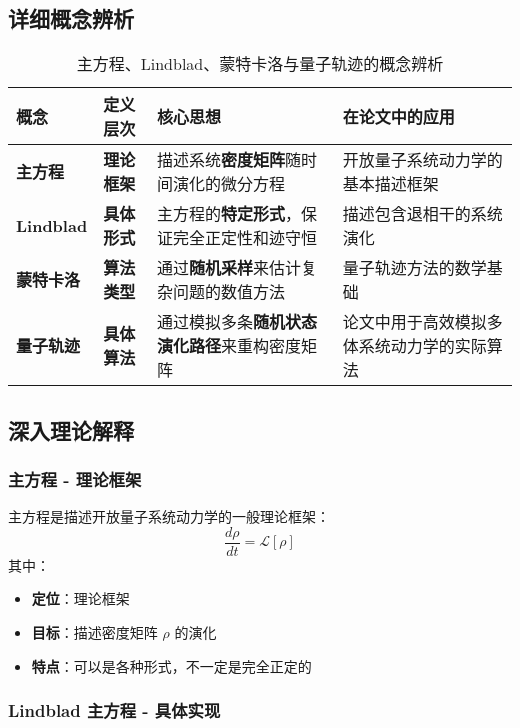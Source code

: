 \documentclass[11pt,a4paper]{article}
\begin{document}
\subsection{详细概念辨析}

\begin{table}[H]
\centering
\caption{主方程、Lindblad、蒙特卡洛与量子轨迹的概念辨析}
\begin{tabular}{|p{}|p{}|p{}|p{}|}
\hline
\textbf{概念} & \textbf{定义层次} & \textbf{核心思想} & \textbf{在论文中的应用} \\
\hline
\textbf{主方程} & \textbf{理论框架} & 描述系统\textbf{密度矩阵}随时间演化的微分方程 & 开放量子系统动力学的基本描述框架 \\
\hline
\textbf{Lindblad} & \textbf{具体形式} & 主方程的\textbf{特定形式}，保证完全正定性和迹守恒 & 描述包含退相干的系统演化 \\
\hline
\textbf{蒙特卡洛} & \textbf{算法类型} & 通过\textbf{随机采样}来估计复杂问题的数值方法 & 量子轨迹方法的数学基础 \\
\hline
\textbf{量子轨迹} & \textbf{具体算法} & 通过模拟多条\textbf{随机状态演化路径}来重构密度矩阵 & 论文中用于高效模拟多体系统动力学的实际算法 \\
\hline
\end{tabular}
\label{tab:concept_comparison}
\end{table}

\subsection{深入理论解释}

\subsubsection{主方程 - 理论框架}

主方程是描述开放量子系统动力学的一般理论框架：
\[
\frac{d\rho}{dt} = \mathcal{L}[\rho]
\]
其中：
\begin{itemize}
    \item \textbf{定位}：理论框架
    \item \textbf{目标}：描述密度矩阵 $\rho$ 的演化
    \item \textbf{特点}：可以是各种形式，不一定是完全正定的
\end{itemize}

\subsubsection{Lindblad 主方程 - 具体实现}
\end{document}
